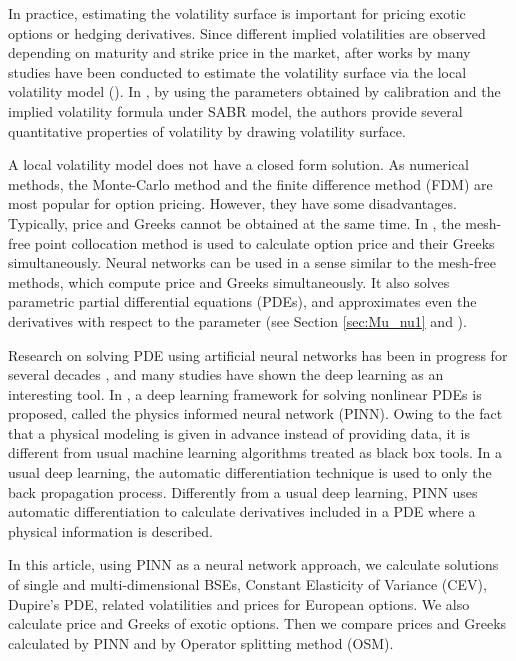 \documentclass[11pt,reqno]{article}
\numberwithin{equation}{section}
\begin{document}
In practice, estimating the volatility surface is important for pricing exotic options or hedging derivatives.
 Since different implied volatilities are observed depending on maturity and strike price in the market,
after works by  \cite{Derman-Kani-1994, Dupire-1994} 
 many studies have been conducted to estimate the volatility surface via the local volatility model
 (\cite{ carr2009, coleman2001, gatheral2011, LARGUINHO2013, ART002537016}).
In \cite{ART002181552}, by using the parameters obtained by calibration 
and the implied volatility formula under SABR model, 
the authors provide several quantitative properties of volatility by drawing volatility surface. 

A local volatility model %
 does not have a closed form solution.
As numerical methods, the Monte-Carlo method and the finite difference method (FDM)
 are most popular for option pricing.
 However, they have some disadvantages.
Typically, price and Greeks cannot be obtained at the same time.
In \cite{kim2014option}, the mesh-free point collocation method %
   is used to calculate option price and their Greeks simultaneously.
 Neural networks can be used in a sense similar to the mesh-free methods,
 which compute price and Greeks simultaneously.
 It also solves parametric partial differential equations (PDEs),
 and approximates even the derivatives with respect to the parameter
  (see Section \ref{sec:Mu_nu1} and \cite{muhyun2022}).

Research on solving PDE using artificial neural networks has been in progress for several decades
 \cite{lee1990neural, lagaris1998artificial, meade1994solution, yentis1996vlsi},
  and many studies \cite{sirignano2018dgm, raissi2019physics, glau2022deep, berner2020numerically} have shown the deep learning as an interesting tool.
  In \cite{raissi2019physics},
   a deep learning framework for solving nonlinear PDEs is proposed, called 
   the physics informed neural network (PINN).
   Owing to the fact that a physical modeling is given in advance instead of providing data,
  it is different from usual machine learning algorithms treated as black box tools.
In a usual deep learning, the automatic differentiation technique is used to only the back propagation process. 
Differently from a usual deep learning, PINN uses automatic differentiation to calculate derivatives included in a PDE where a physical information is described. 

In this article, using PINN as a neural network approach, 
we calculate solutions of single and multi-dimensional BSEs, Constant Elasticity of Variance (CEV),
Dupire's PDE, related volatilities and prices for European options.
%
We also calculate price and Greeks of exotic options.
 Then we compare  prices and Greeks calculated by PINN and by Operator splitting method (OSM).
 
\end{document}
